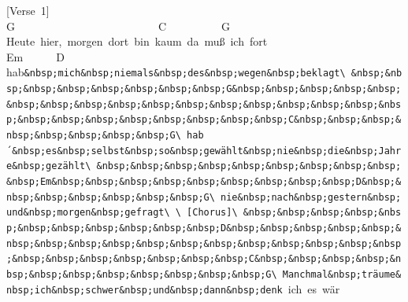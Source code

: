 \documentclass[]{book}
\begin{document}
{[}Verse~1{]}\\
\hspace*{0.333em}\hspace*{0.333em}\hspace*{0.333em}\hspace*{0.333em}\hspace*{0.333em}\hspace*{0.333em}G~~~~~~~~~~~~~~~~~~~~~~~~~~C~~~~~~~~~~G\\
Heute~hier,~morgen~dort~bin~kaum~da~muß~ich~fort\\
\hspace*{0.333em}\hspace*{0.333em}\hspace*{0.333em}\hspace*{0.333em}\hspace*{0.333em}\hspace*{0.333em}\hspace*{0.333em}\hspace*{0.333em}\hspace*{0.333em}\hspace*{0.333em}\hspace*{0.333em}\hspace*{0.333em}\hspace*{0.333em}\hspace*{0.333em}\hspace*{0.333em}\hspace*{0.333em}\hspace*{0.333em}\hspace*{0.333em}\hspace*{0.333em}\hspace*{0.333em}\hspace*{0.333em}\hspace*{0.333em}Em~~~~~~D\\
hab\texttt{\&nbsp;mich\&nbsp;niemals\&nbsp;des\&nbsp;wegen\&nbsp;beklagt\textbackslash{}\ \&nbsp;\&nbsp;\&nbsp;\&nbsp;\&nbsp;\&nbsp;\&nbsp;\&nbsp;G\&nbsp;\&nbsp;\&nbsp;\&nbsp;\&nbsp;\&nbsp;\&nbsp;\&nbsp;\&nbsp;\&nbsp;\&nbsp;\&nbsp;\&nbsp;\&nbsp;\&nbsp;\&nbsp;\&nbsp;\&nbsp;\&nbsp;\&nbsp;\&nbsp;\&nbsp;\&nbsp;\&nbsp;\&nbsp;C\&nbsp;\&nbsp;\&nbsp;\&nbsp;\&nbsp;\&nbsp;\&nbsp;\&nbsp;G\textbackslash{}\ hab´\&nbsp;es\&nbsp;selbst\&nbsp;so\&nbsp;gewählt\&nbsp;nie\&nbsp;die\&nbsp;Jahre\&nbsp;gezählt\textbackslash{}\ \&nbsp;\&nbsp;\&nbsp;\&nbsp;\&nbsp;\&nbsp;\&nbsp;\&nbsp;\&nbsp;\&nbsp;Em\&nbsp;\&nbsp;\&nbsp;\&nbsp;\&nbsp;\&nbsp;\&nbsp;\&nbsp;\&nbsp;D\&nbsp;\&nbsp;\&nbsp;\&nbsp;\&nbsp;\&nbsp;\&nbsp;G\textbackslash{}\ nie\&nbsp;nach\&nbsp;gestern\&nbsp;und\&nbsp;morgen\&nbsp;gefragt\textbackslash{}\ \textbackslash{}\ {[}Chorus{]}\textbackslash{}\ \&nbsp;\&nbsp;\&nbsp;\&nbsp;\&nbsp;\&nbsp;\&nbsp;\&nbsp;\&nbsp;\&nbsp;\&nbsp;D\&nbsp;\&nbsp;\&nbsp;\&nbsp;\&nbsp;\&nbsp;\&nbsp;\&nbsp;\&nbsp;\&nbsp;\&nbsp;\&nbsp;\&nbsp;\&nbsp;\&nbsp;\&nbsp;\&nbsp;\&nbsp;\&nbsp;\&nbsp;\&nbsp;\&nbsp;\&nbsp;\&nbsp;C\&nbsp;\&nbsp;\&nbsp;\&nbsp;\&nbsp;\&nbsp;\&nbsp;\&nbsp;\&nbsp;\&nbsp;\&nbsp;\&nbsp;G\textbackslash{}\ Manchmal\&nbsp;träume\&nbsp;ich\&nbsp;schwer\&nbsp;und\&nbsp;dann\&nbsp;denk}~ich~es~wär\\
\end{document}
